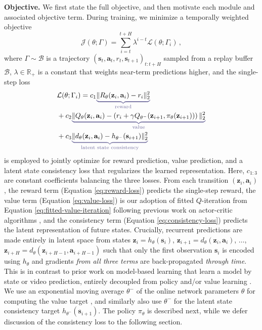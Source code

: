\documentclass{article}
\begin{document}
\textbf{Objective.} We first state the full objective, and then motivate each module and associated objective term. During training, we minimize a temporally weighted objective
\begin{equation}
\label{eq:objective}
    \mathcal{J}(\theta; \Gamma) = \sum_{i=t}^{t+H} \lambda^{i-t} \mathcal{L}(\theta; \Gamma_{i})\,,
\end{equation}
where $\Gamma \sim \mathcal{B}$ is a trajectory $(\mathbf{s}_{t}, \mathbf{a}_{t}, r_{t}, \mathbf{s}_{t+1})_{t:t+H}$ sampled from a replay buffer $\mathcal{B}$, $\lambda \in \mathbb{R}_{+}$ is a constant that weights near-term predictions higher, and the single-step loss
\begin{align}
    \label{eq:reward-loss} &\mathcal{L}(\theta; \Gamma_{i}) = c_{1} {\color{CadetBlue}\underbrace{{\color{black} \| R_{\theta}(\mathbf{z}_{i}, \mathbf{a}_{i}) - r_{i} \|^{2}_{2}}}_\text{reward}}\\
    \label{eq:value-loss} &+ c_{2} {\color{CadetBlue}\underbrace{{\color{black} \| Q_{\theta}(\mathbf{z}_{i}, \mathbf{a}_{i}) - \left( r_{i} + \gamma Q_{\theta^{-}}(\mathbf{z}_{i+1}, \pi_{\theta}(\mathbf{z}_{i+1})) \right) \|^{2}_{2}}}_\text{value}}\\
    \label{eq:consistency-loss} &+ c_{3} {\color{CadetBlue}\underbrace{{\color{black}\| d_{\theta}(\mathbf{z}_{i}, \mathbf{a}_{i}) - h_{\theta^{-}}(\mathbf{s}_{i+1}) \|^{2}_{2}}}_{\text{latent state consistency}}}
\end{align}
is employed to jointly optimize for reward prediction, value prediction, and a latent state consistency loss that regularizes the learned representation. Here, $c_{1:3}$ are constant coefficients balancing the three losses. From each transition $(\mathbf{z}_{i}, \mathbf{a}_{i})$, the reward term (Equation \ref{eq:reward-loss}) predicts the single-step reward, the value term (Equation \ref{eq:value-loss}) is our adoption of fitted $Q$-iteration from Equation \ref{eq:fitted-value-iteration} following previous work on actor-critic algorithms \citep{Lillicrap2016ContinuousCW, Haarnoja2018SoftAA}, and the consistency term (Equation \ref{eq:consistency-loss}) predicts the latent representation of future states. Crucially, recurrent predictions are made entirely in latent space from states $\mathbf{z}_{i} = h_{\theta}(\mathbf{s}_{i})$, $\mathbf{z}_{i+1} = d_{\theta}(\mathbf{z}_{i}, \mathbf{a}_{i})$, $\dots$, $\mathbf{z}_{i+H} = d_{\theta}(\mathbf{z}_{i+H-1}, \mathbf{a}_{i+H-1})$ such that only the first observation $\mathbf{s}_{i}$ is encoded using $h_{\theta}$ and gradients \emph{from all three terms} are back-propagated \textit{through time}. This is in contrast to prior work on model-based learning that learn a model by state or video prediction, entirely decoupled from policy and/or value learning \citep{ha2018worldmodels, Hafner2020DreamTC, Sikchi2020LearningOW}. We use an exponential moving average $\theta^{-}$ of the online network parameters $\theta$ for computing the value target \cite{Lillicrap2016ContinuousCW}, and similarly also use $\theta^{-}$ for the latent state consistency target $h_{\theta^{-}}(\mathbf{s}_{i+1})$. The policy $\pi_{\theta}$ is described next, while we defer discussion of the consistency loss to the following section.
\end{document}
